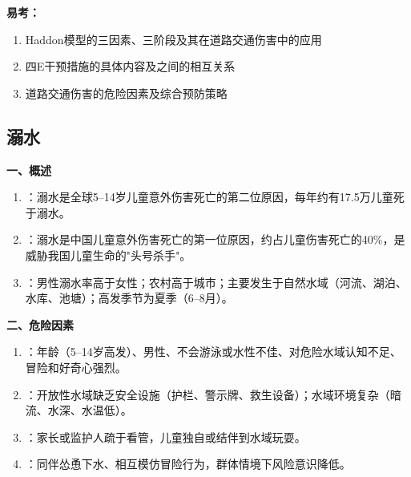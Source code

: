 \begin{exambox}
\textbf{易考：}
\begin{enumerate}[leftmargin=*]
    \item Haddon模型的三因素、三阶段及其在道路交通伤害中的应用
    \item 四E干预措施的具体内容及之间的相互关系
    \item 道路交通伤害的危险因素及综合预防策略
\end{enumerate}
\end{exambox}

\subsection{溺水}

\begin{keybox}
\textbf{一、概述}
\begin{enumerate}[leftmargin=*]
    \item {}：溺水是全球5--14岁儿童意外伤害死亡的第二位原因，每年约有17.5万儿童死于溺水。
    \item {}：溺水是中国儿童意外伤害死亡的第一位原因，约占儿童伤害死亡的40\%，是威胁我国儿童生命的"头号杀手"。
    \item {}：男性溺水率高于女性；农村高于城市；主要发生于自然水域（河流、湖泊、水库、池塘）；高发季节为夏季（6--8月）。
\end{enumerate}

\textbf{二、危险因素}
\begin{enumerate}[leftmargin=*]
    \item {}：年龄（5--14岁高发）、男性、不会游泳或水性不佳、对危险水域认知不足、冒险和好奇心强烈。
    \item {}：开放性水域缺乏安全设施（护栏、警示牌、救生设备）；水域环境复杂（暗流、水深、水温低）。
    \item {}：家长或监护人疏于看管，儿童独自或结伴到水域玩耍。
    \item {}：同伴怂恿下水、相互模仿冒险行为，群体情境下风险意识降低。
\end{enumerate}


\end{keybox}
